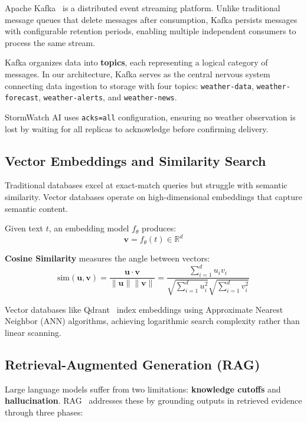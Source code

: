 \documentclass[11pt,a4paper]{article}
\begin{document}
Apache Kafka~\cite{kafka} is a distributed event streaming platform. Unlike traditional message queues that delete messages after consumption, Kafka persists messages with configurable retention periods, enabling multiple independent consumers to process the same stream.

Kafka organizes data into \textbf{topics}, each representing a logical category of messages. In our architecture, Kafka serves as the central nervous system connecting data ingestion to storage with four topics: \texttt{weather-data}, \texttt{weather-forecast}, \texttt{weather-alerts}, and \texttt{weather-news}.

\begin{highlightbox}
StormWatch AI uses \texttt{acks=all} configuration, ensuring no weather observation is lost by waiting for all replicas to acknowledge before confirming delivery.
\end{highlightbox}

\subsection{Vector Embeddings and Similarity Search}

Traditional databases excel at exact-match queries but struggle with semantic similarity. Vector databases operate on high-dimensional embeddings that capture semantic content.

\begin{mathbox}
Given text $t$, an embedding model $f_\theta$ produces:
\[
\mathbf{v} = f_\theta(t) \in \mathbb{R}^d
\]

\textbf{Cosine Similarity} measures the angle between vectors:
\[
\text{sim}(\mathbf{u}, \mathbf{v}) = \frac{\mathbf{u} \cdot \mathbf{v}}{\|\mathbf{u}\| \|\mathbf{v}\|} = \frac{\sum_{i=1}^{d} u_i v_i}{\sqrt{\sum_{i=1}^{d} u_i^2} \sqrt{\sum_{i=1}^{d} v_i^2}}
\]
\end{mathbox}

Vector databases like Qdrant~\cite{qdrant} index embeddings using Approximate Nearest Neighbor (ANN) algorithms, achieving logarithmic search complexity rather than linear scanning.

\subsection{Retrieval-Augmented Generation (RAG)}

Large language models suffer from two limitations: \textbf{knowledge cutoffs} and \textbf{hallucination}. RAG~\cite{rag} addresses these by grounding outputs in retrieved evidence through three phases:
\end{document}
